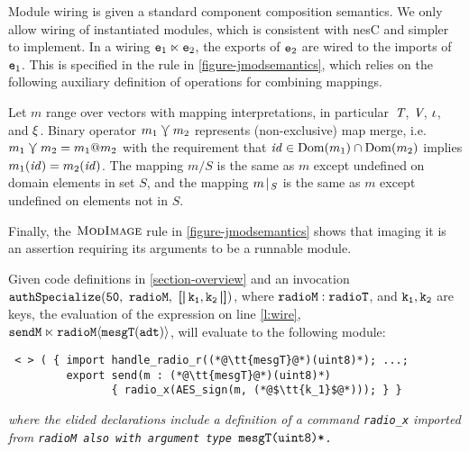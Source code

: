 Module wiring is given a standard component composition semantics. We only allow wiring of
instantiated modules, which is consistent with nesC and simpler to implement. In a wiring
$\jwire{\tt{e}_1}{\tt{e}_2}$, the exports of $\tt{e}_2$ are wired to the imports of $\tt{e}_1$.
This is specified in the  rule in \autoref{figure-jmodsemantics}, which relies
on the following auxiliary definition of operations for combining mappings.
\begin{definition}
  Let $m$ range over vectors with mapping interpretations, in particular~$\tpdecl$, $\vpdecl$,
  $\imports$, and $\exports$. Binary operator $m_1\maploosemerge m_2$ represents (non-exclusive)
  map merge, i.e.~$m_1 \maploosemerge m_2 = m_1 @ m_2$ with the requirement that $\identifier\in
  \dom(m_1)\cap\dom(m_2)$ implies $m_1(\identifier) = m_2(\identifier)$.
  The mapping $m / S$ is the same as $m$ except undefined on domain elements in set $S$, and the
  mapping $\restrict{m}{S}$ is the same as $m$ except undefined on elements not in ${S}$.
\end{definition}
Finally, the $\TirName{ModImage}$ rule in \autoref{figure-jmodsemantics} shows that imaging it
is an assertion requiring its arguments to be a runnable module.

%
\begin{exmp}
\label{example-scalanesssemantics}
Given code definitions in \autoref{section-overview} and an invocation
$\tt{authSpecialize}(\tt{50},\ \tt{radioM},\ \arr{\tt{k_1,k_2}})$, where $\tt{radioM: radioT}$,
and $\tt{k_1,k_2}$ are keys, the evaluation of the expression on line \ref{l:wire}, $\tt{sendM
  \ltimes \jinst{radioM}{mesgT(adt)}}$, will evaluate to the following module:
\end{exmp}
\vspace{-3mm}
\lstset{numbers=none, numberstyle=\tiny, firstnumber=5, stepnumber=1,
  numbersep=0pt, basicstyle=\ttfamily}
{\small
\begin{lstlisting}
 < > ( { import handle_radio_r((*@\tt{mesgT}@*)(uint8)*); ...;
         export send(m : (*@\tt{mesgT}@*)(uint8)*) 
                { radio_x(AES_sign(m, (*@$\tt{k_1}$@*))); } }
\end{lstlisting}} 
\emph{where the elided declarations include a definition of a command
\textup{\texttt{radio\_x}} imported from \tt{radioM} also with argument type
$\tt{mesgT}\textup{\texttt{(uint8)*}}$.}


